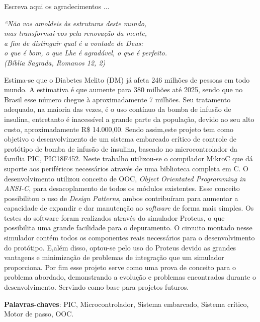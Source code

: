 \documentclass[	12pt, Times, openright, twoside, a4paper, english, brazil]{abntex2}
\begin{document}
\begin{agradecimentos}
Escreva aqui os agradecimentos ...

\end{agradecimentos}

\begin{epigrafe}
    \vspace*{\fill}
	\begin{flushright}
		\textit{``Não vos amoldeis às estruturas deste mundo, \\
		mas transformai-vos pela renovação da mente, \\
		a fim de distinguir qual é a vontade de Deus: \\
		o que é bom, o que Lhe é agradável, o que é perfeito.\\
		(Bíblia Sagrada, Romanos 12, 2)}
	\end{flushright}
\end{epigrafe}


\begin{resumo}
Estima-se que o Diabetes Melito (DM) já afeta 246 milhões de pessoas em todo mundo. A estimativa é que aumente para 380 milhões até 2025, sendo que no Brasil esse número chegue à aproximadamente 7 milhões. Seu tratamento adequado, na maioria das vezes, é o uso contínuo da bomba de infusão de insulina, entretanto é inacessível a grande parte da população, devido ao seu alto custo, aproximadamente R\$ 14.000,00. Sendo assim,este projeto tem como objetivo o desenvolvimento de um sistema embarcado crítico de controle de protótipo de bomba de infusão de insulina, baseado no microcontrolador da família PIC, PIC18F452. Neste trabalho utilizou-se o compilador MikroC que dá suporte aos periféricos necessários através de uma biblioteca completa em C. O desenvolvimento utilizou conceito de OOC, \emph{Object Orientated Programming in ANSI-C}, para desacoplamento de todos os módulos existentes. Esse conceito possibilitou o uso de \emph{Design Patterns}, ambos contribuíram para aumentar a capacidade de expandir e dar manutenção ao \emph{software} de forma mais simples. Os testes do software foram realizados através do simulador Proteus, o que possibilita uma grande facilidade para o depuramento. O circuito montado nesse simulador contém todos os componentes reais necessários para o desenvolvimento do protótipo. E,além disso, optou-se pelo uso do Proteus devido as grandes vantagens e minimização de problemas de integração que um simulador proporciona. Por fim esse projeto serve como uma prova de conceito para o problema abordado, demonstrando a evolução e problemas encontrados durante o desenvolvimento. Servindo como base para projetos futuros.

 
 \vspace{\onelineskip}
    
 \noindent
 \textbf{Palavras-chaves}: PIC, Microcontrolador, Sistema embarcado, Sistema crítico, Motor de passo, OOC.
\end{resumo}
\end{document}

